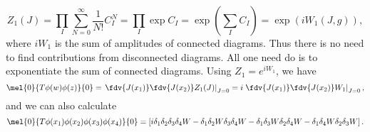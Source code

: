 \documentclass{jknotes} %
\begin{document}
\begin{equation}
    Z_1(J) = \prod_I\sum^\infty_{N=0}\frac{1}{N!}C_I^N = \prod_I\exp C_I = \exp(\sum_IC_I) = \exp(iW_1(J,g)),
\end{equation}
where \(iW_1\) is the sum of amplitudes of connected diagrams. Thus there is no need to find contributions from disconnected diagrams. All one need do is to exponentiate the sum of connected diagrams. Using \(Z_1=e^{iW_1}\), we have
\begin{equation}
    \mel{0}{T\phi(w)\phi(z)}{0} 
    = \left.\fdv{J(x_1)}\fdv{J(x_2)}Z_1(J)\right|_{J=0}
    = i\left.\fdv{J(x_1)}\fdv{J(x_2)}W_1\right|_{J=0},
\end{equation}
and we can also calculate
\begin{equation}
    \mel{0}{T\phi(x_1)\phi(x_2)\phi(x_3)\phi(x_4)}{0}
    = \left[i\delta_1\delta_2\delta_3\delta_4W 
        - \delta_1\delta_2W\delta_3\delta_4W
        - \delta_1\delta_3W\delta_2\delta_4W
    - \delta_1\delta_4W\delta_2\delta_3W\right].
\end{equation}
\end{document}
